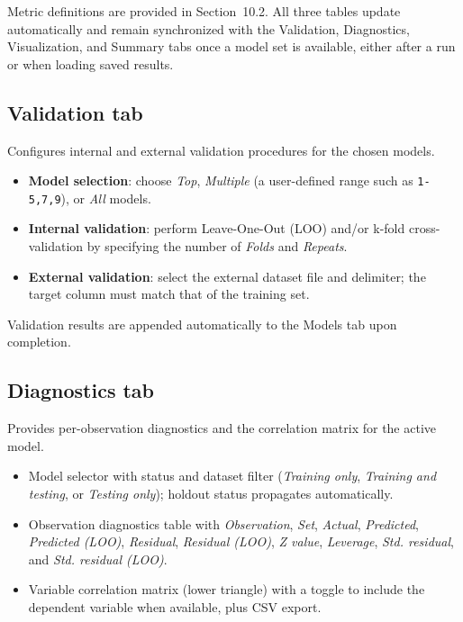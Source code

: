 \documentclass[11pt,a4paper]{article}
\begin{document}
\noindent Metric definitions are provided in Section~10.2.
All three tables update automatically and remain synchronized with the Validation, Diagnostics, Visualization, and Summary tabs once a model set is available, either after a run or when loading saved results.

\subsection{\textbf{Validation} tab}
Configures internal and external validation procedures for the chosen models.

\begin{itemize}
  \item \textbf{Model selection}: choose \emph{Top}, \emph{Multiple} (a user-defined range such as \texttt{1-5,7,9}), or \emph{All} models.
  \item \textbf{Internal validation}: perform Leave-One-Out (LOO) and/or k-fold cross-validation by specifying the number of \emph{Folds} and \emph{Repeats}.
  \item \textbf{External validation}: select the external dataset file and delimiter; the target column must match that of the training set.
\end{itemize}

\noindent Validation results are appended automatically to the Models tab upon completion.

\subsection{\textbf{Diagnostics} tab}
Provides per-observation diagnostics and the correlation matrix for the active model.
\begin{itemize}
  \item Model selector with status and dataset filter (\emph{Training only}, \emph{Training and testing}, or \emph{Testing only}); holdout status propagates automatically.
  \item Observation diagnostics table with \emph{Observation}, \emph{Set}, \emph{Actual}, \emph{Predicted}, \emph{Predicted (LOO)}, \emph{Residual}, \emph{Residual (LOO)}, \emph{Z value}, \emph{Leverage}, \emph{Std. residual}, and \emph{Std. residual (LOO)}.
  \item Variable correlation matrix (lower triangle) with a toggle to include the dependent variable when available, plus CSV export.
\end{itemize}
\end{document}
